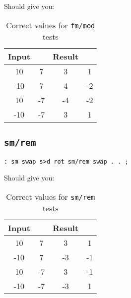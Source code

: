 \noindent Should give you: 

\begin{table}[h!]
\centering
\begin{tabular}{ | c c || c c | }
        \hline
	Input & & Result & \\
        \hline
         10 &  7 &  3 &  1\\
        -10 &  7 &  4 & -2 \\
         10 & -7 & -4 & -2\\
        -10 & -7 &  3 &  1\\
        \hline
\end{tabular}
        \caption{Correct values for \texttt{fm/mod} tests}
        \label{table_fmmod}
\end{table}


\subsection{\texttt{sm/rem}}

\begin{lstlisting}[frame=lines]
        : sm swap s>d rot sm/rem swap . . ; 
\end{lstlisting}

\noindent Should give you: 

\begin{table}[h!]
\centering
\begin{tabular}{ | c c || c c | }
        \hline
	Input & & Result & \\
        \hline
         10 &  7 &  3 &  1\\
        -10 &  7 & -3 & -1 \\
         10 & -7 &  3 & -1\\
        -10 & -7 & -3 &  1\\
        \hline
\end{tabular}
        \caption{Correct values for \texttt{sm/rem} tests}
        \label{table_smrem}
\end{table}

